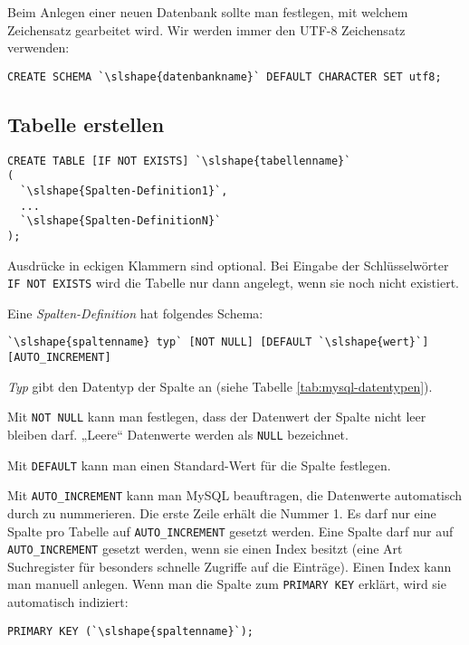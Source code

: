 Beim Anlegen einer neuen Datenbank sollte man festlegen, mit welchem Zeichensatz gearbeitet wird. Wir
werden immer den UTF-8 Zeichensatz verwenden:

\begin{lstlisting}
CREATE SCHEMA `\slshape{datenbankname}` DEFAULT CHARACTER SET utf8;
\end{lstlisting}


\subsection{Tabelle erstellen}

\begin{lstlisting}
CREATE TABLE [IF NOT EXISTS] `\slshape{tabellenname}`
(
  `\slshape{Spalten-Definition1}`,
  ...  
  `\slshape{Spalten-DefinitionN}`
);
\end{lstlisting}

Ausdrücke in eckigen Klammern sind optional. Bei Eingabe der Schlüsselwörter
\lstinline{IF NOT EXISTS} wird die Tabelle nur dann angelegt, wenn sie noch
nicht existiert.

Eine \textit{Spalten-Definition} hat folgendes Schema:

\begin{lstlisting}
`\slshape{spaltenname} typ` [NOT NULL] [DEFAULT `\slshape{wert}`] [AUTO_INCREMENT]
\end{lstlisting}

\textit{Typ} gibt den Datentyp der Spalte an (siehe Tabelle
\ref{tab:mysql-datentypen}).

Mit \lstinline{NOT NULL} kann man festlegen, dass der Datenwert der Spalte nicht
leer bleiben darf. „Leere“ Datenwerte werden als \lstinline{NULL} bezeichnet.

Mit \lstinline{DEFAULT} kann man einen Standard-Wert für die Spalte festlegen.

Mit \lstinline{AUTO_INCREMENT} kann man MySQL beauftragen, die Datenwerte
automatisch durch zu nummerieren. Die erste Zeile erhält die Nummer 1. Es darf
nur eine Spalte pro Tabelle auf \lstinline{AUTO_INCREMENT} gesetzt werden. Eine
Spalte darf nur auf \lstinline{AUTO_INCREMENT} gesetzt werden, wenn sie einen
Index besitzt (eine Art Suchregister für besonders schnelle Zugriffe auf die
Einträge). Einen Index kann man manuell anlegen. Wenn man die Spalte zum
\lstinline{PRIMARY KEY} erklärt, wird sie automatisch indiziert:

\begin{lstlisting}
PRIMARY KEY (`\slshape{spaltenname}`);
\end{lstlisting}

